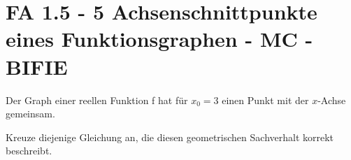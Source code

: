 \section{FA 1.5 - 5 Achsenschnittpunkte eines Funktionsgraphen - MC - BIFIE}

\begin{beispiel}[FA 1.5]{1} %
Der Graph einer reellen Funktion f hat für $x_0 = 3$ einen Punkt mit der $x$-Achse gemeinsam. 

\leer

Kreuze diejenige Gleichung an, die diesen geometrischen Sachverhalt korrekt beschreibt.


\end{beispiel}